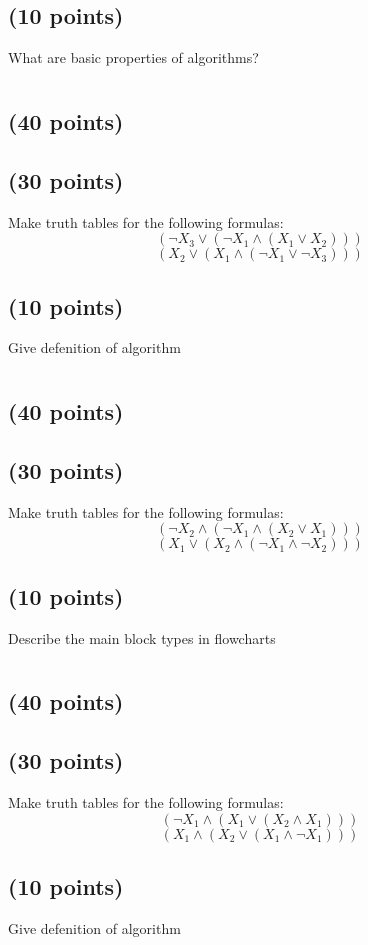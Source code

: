 \documentclass[a4paper,10pt]{article}
\begin{document}
\subsection{(10 points)}
What are basic properties of algorithms?

\newpage

\section{}
\subsection{(40 points)}


\subsection{(30 points)}
 Make truth tables for the following formulas:
\[
(\neg X_{3} \vee (\neg X_{1} \wedge (X_{1} \vee X_{2})))
\]
\[
(X_{2} \vee (X_{1} \wedge (\neg X_{1} \vee \neg X_{3})))
\]

\subsection{(10 points)}
Give defenition of algorithm

\newpage

\section{}
\subsection{(40 points)}


\subsection{(30 points)}
 Make truth tables for the following formulas:
\[
(\neg X_{2} \wedge (\neg X_{1} \wedge (X_{2} \vee X_{1})))
\]
\[
(X_{1} \vee (X_{2} \wedge (\neg X_{1} \wedge \neg X_{2})))
\]

\subsection{(10 points)}
Describe the main block types in flowcharts

\newpage

\section{}
\subsection{(40 points)}


\subsection{(30 points)}
 Make truth tables for the following formulas:
\[
(\neg X_{1} \wedge (X_{1} \vee (X_{2} \wedge X_{1})))
\]
\[
(X_{1} \wedge (X_{2} \vee (X_{1} \wedge \neg X_{1})))
\]

\subsection{(10 points)}
Give defenition of algorithm

\newpage
\end{document}
